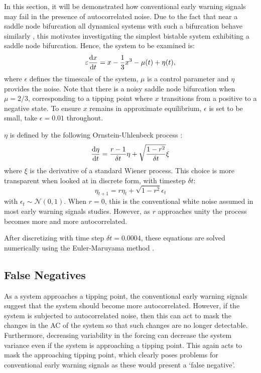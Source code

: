 In this section, it will be demonstrated how conventional early warning signals may fail in the presence of autocorrelated  noise. Due to the fact that near a
saddle node bifurcation all dynamical systems with such a
bifurcation behave similarly \parencite{guckenheimer2013}, this motivates investigating 
the simplest bistable system exhibiting a saddle node
bifurcation. Hence, the system to be examined is: 
\begin{equation}
    \label{eq:dynamical_system}
    \varepsilon\dv{x}{t} =  x - \frac{1}{3}x^3 - \mu(t) + \eta(t),
\end{equation}
where $\epsilon$ defines the timescale of the system, $\mu$ is a control parameter and $\eta$ provides the noise. Note that there is a
noisy saddle node bifurcation
when $\mu = 2/3$, corresponding to a tipping point where
$x$ transitions from a positive to a negative state. To ensure
$x$ remains in approximate equilibrium, $\epsilon$ is set to be small,
take $\epsilon = 0.01$ throughout.


$\eta$ is defined by the following Ornstein-Uhlenbeck process \parencite{Uhlenbeck1930}:
\begin{equation}
\label{eq:white_red_forcing}
    \dv{\eta}{t} = \frac{r-1}{\delta t}\eta + \sqrt{\frac{1-r^2}{\delta t}} \xi
\end{equation}
where $\xi$ is the derivative of a standard Wiener process. 
This choice is more transparent when looked at in discrete form, with timestep 
$\delta t$:
\begin{equation}
    \label{eq:discretized_white_or_red_noise}
    \eta_{t+1} = r\eta_t + \sqrt{1-r^2} \epsilon_t
\end{equation}
with $\epsilon_t \sim \mathcal{N}(0,1)$. When $r = 0$, this is 
the conventional white noise assumed in most early warning signals
studies. However, as $r$ approaches unity the process becomes
more and more autocorrelated.

After discretizing with time step $\delta t = 0.0004$,
these equations are solved numerically using the 
Euler-Maruyama method \parencite{Jacobs2010}.


\subsection{False Negatives}
As a system approaches a tipping point, the conventional
early warning signals suggest that the system should become more
autocorrelated. However, if the system is subjected to autocorrelated noise,
then this can act to mask the changes in the AC of the system so that such
changes are no longer detectable. Furthermore, decreasing variability in
the forcing can decrease the system variance even if the system is 
approaching a tipping point. This again acts to mask the approaching tipping point, which clearly poses problems for conventional
early warning signals as these would present a `false negative'.

